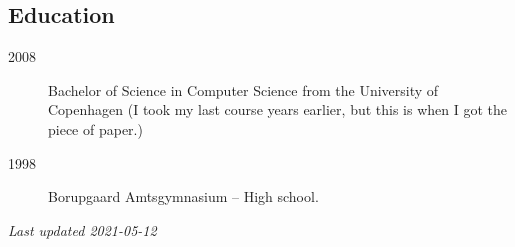 \documentclass[margin,line,a4paper]{resume}
\begin{document}
\begin{resume}
\section{\mysidestyle Education}\vspace{1mm}
 \begin{description}
\item[2008] Bachelor of Science in Computer Science from
the University of Copenhagen (I took my last course years earlier, but this is
when I got the piece of paper.)
\item[1998] Borupgaard Amtsgymnasium -- High school.
\end{description}


{\em Last updated 2021-05-12}
\end{resume}
\end{document}
